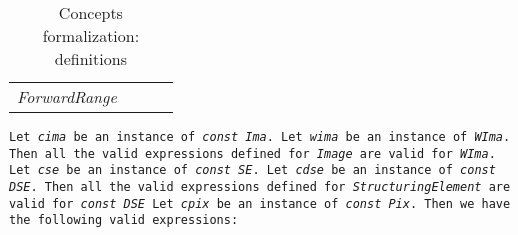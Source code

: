\begin{table}[htbp]
\begin{scriptsize}
\begin{tabular}{l|l|l|l|}
{      \emph{ForwardRange}}                                                                                                                                      \\
      \cline{1-4}
    \end{tabular}
  \end{scriptsize}
  \smallskip

  \caption{Concepts formalization: definitions}
  \label{concept.tables.definitions}
\end{table}


\begin{table}[htbp]

  \begin{scriptsize}
    \texttt{Let \emph{cima} be an instance of \emph{const Ima}. Let \emph{wima} be an instance of \emph{WIma}. Then all the
      valid expressions defined for \emph{Image} are valid for \emph{WIma}. Let \emph{cse} be an instance of \emph{const SE}.
      Let \emph{cdse} be an instance of \emph{const DSE}. Then all the valid expressions defined for \emph{StructuringElement}
      are valid for \emph{const DSE} Let \emph{cpix} be an instance of \emph{const Pix}. Then we have the following valid
      expressions:}


\end{scriptsize}
\end{table}
